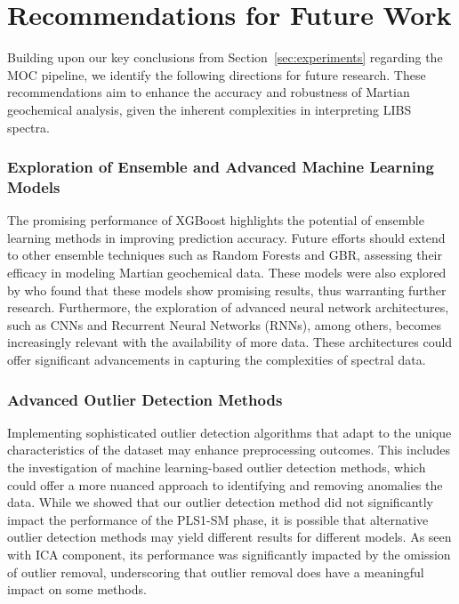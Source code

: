 \section{Recommendations for Future Work}\label{sec:recommendations_for_future_work}
Building upon our key conclusions from Section~\ref{sec:experiments} regarding the MOC pipeline, we identify the following directions for future research.
These recommendations aim to enhance the accuracy and robustness of Martian geochemical analysis, given the inherent complexities in interpreting LIBS spectra.

\subsubsection*{Exploration of Ensemble and Advanced Machine Learning Models} The promising performance of XGBoost highlights the potential of ensemble learning methods in improving prediction accuracy. 
Future efforts should extend to other ensemble techniques such as Random Forests and GBR, assessing their efficacy in modeling Martian geochemical data.
These models were also explored by \citet{andersonPostlandingMajorElement2022} who found that these models show promising results, thus warranting further research.
Furthermore, the exploration of advanced neural network architectures, such as CNNs and Recurrent Neural Networks (RNNs), among others, becomes increasingly relevant with the availability of more data.
These architectures could offer significant advancements in capturing the complexities of spectral data.

\subsubsection*{Advanced Outlier Detection Methods} Implementing sophisticated outlier detection algorithms that adapt to the unique characteristics of the dataset may enhance preprocessing outcomes.
This includes the investigation of machine learning-based outlier detection methods, which could offer a more nuanced approach to identifying and removing anomalies the data.
While we showed that our outlier detection method did not significantly impact the performance of the PLS1-SM phase, it is possible that alternative outlier detection methods may yield different results for different models.
As seen with ICA component, its performance was significantly impacted by the omission of outlier removal, underscoring that outlier removal does have a meaningful impact on some methods.

